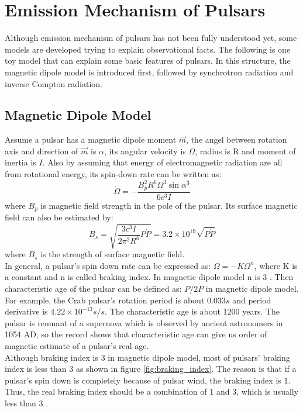 \documentclass[12pt]{report}
\begin{document}
    \section{Emission Mechanism of Pulsars}
            Although emission mechanism of pulsars has not been fully understood yet, some models are developed 
            trying to explain observational facts. The following is one toy model that can explain some basic 
            features of pulsars. In this structure, the magnetic dipole model is introduced first, followed by 
            synchrotron radiation and inverse Compton radiation. 
       
        \subsection{Magnetic Dipole Model}
            Assume a pulsar has a magnetic dipole moment $\vec{m}$, the angel between rotation axis and 
            direction of 
            $\vec{m}$ is $\alpha$, its angular velocity is $\Omega$, radius is R and moment of inertia is $I$. 
            Also by 
            assuming that energy of electromagnetic radiation are all from rotational energy, its spin-down 
            rate can be written 
            as: 
            $$
                \dot{\Omega}=-\frac{B_p^2 R^6 \Omega^3 \sin{\alpha}^3}{6c^3I}
            $$
            where $B_p$ is magnetic field strength in the pole of the pulsar. Its surface magnetic field can 
            also be estimated
            by:
            $$
                B_s=\sqrt{\frac{3c^3I}{2\pi^2R^6}P\dot{P}}=3.2\times 10^{19}\sqrt{P\dot{P}}
            $$
            where $B_s$ is the strength of surface magnetic field. \\
            \indent In general, a pulsar's spin down rate can be expressed as: $\dot{\Omega}=-K\Omega^{n}$, 
            where K is a 
            constant and n is called braking index. In magnetic dipole model n is 3 \cite{Tong2015}. Then 
            characteristic age of the pulsar can be defined as: $P/2\dot{P}$ in magnetic dipole model. 
            For example, the Crab 
            pulsar's rotation period is about $0.033s$ and period derivative is $4.22\times 10^{-13}s/s$. 
            The characteristic 
            age is about 1200 years. The pulsar is remnant of a supernova which is observed by ancient 
            astronomers in 1054 
            AD, so the record shows that characteristic age can give us order of magnetic estimate of a 
            pulsar's real age. \\
            \indent 
            Although braking index is 3 in magnetic dipole model, most of pulsars' braking index is less than 3 as 
            shown in figure \ref{fig:braking_index}. The reason is that if a pulsar's spin down is completely because
            of pulsar wind, the braking index is 1. Thus, the real braking index should be a combination of 1 and 3,
            which is usually less than 3 \cite{PhysRevD.91.063007}.
\end{document}
